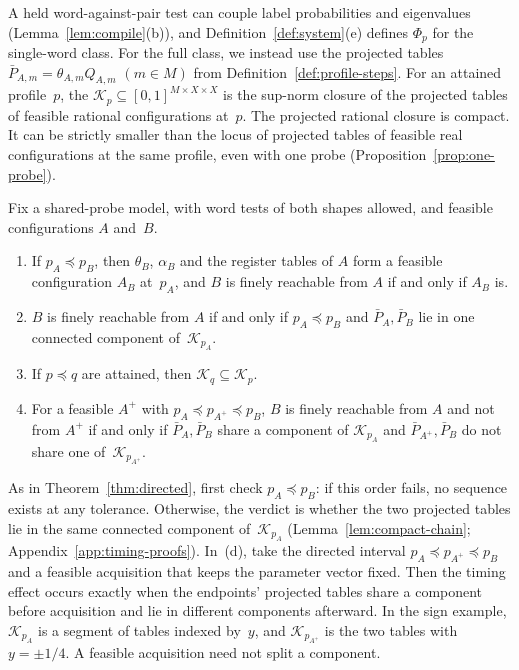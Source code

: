A held word-against-pair test can couple label probabilities and
eigenvalues (Lemma~\ref{lem:compile}(b)), and Definition~\ref{def:system}(e)
defines $\Phi_p$ for the single-word class. For the full class, we instead
use the projected tables $\bar P_{A,m}=\theta_{A,m}Q_{A,m}$ $(m\in M)$
from Definition~\ref{def:profile-steps}. For an attained profile~$p$, the
 $\mathcal K_p\subseteq[0,1]^{M\times X\times X}$ is the sup-norm
closure of the projected tables of feasible rational configurations at~$p$.
The projected rational closure is compact. It can be strictly smaller than
the locus of projected tables of feasible real configurations at the same
profile, even with one probe (Proposition~\ref{prop:one-probe}).

\begin{theorem}\label{thm:projected-components}
Fix a shared-probe model, with word tests of both shapes allowed, and
feasible configurations $A$ and~$B$.
\begin{enumerate}
\item[(a)] If $p_A\preceq p_B$, then $\theta_B$, $\alpha_B$ and the
register tables of $A$ form a feasible configuration $A_B$ at~$p_A$, and
$B$ is finely reachable from $A$ if and only if $A_B$ is.
\item[(b)] $B$ is finely reachable from $A$ if and only if
$p_A\preceq p_B$ and $\bar P_A,\bar P_B$ lie in one connected component
of~$\mathcal K_{p_A}$.
\item[(c)] If $p\preceq q$ are attained, then
$\mathcal K_q\subseteq\mathcal K_p$.
\item[(d)] For a feasible $A^+$ with
$p_A\preceq p_{A^+}\preceq p_B$, $B$ is finely reachable from $A$ and
not from $A^+$ if and only if $\bar P_A,\bar P_B$ share a component of
$\mathcal K_{p_A}$ and $\bar P_{A^+},\bar P_B$ do not share one
of~$\mathcal K_{p_{A^+}}$.
\end{enumerate}
\end{theorem}

As in Theorem~\ref{thm:directed}, first check $p_A\preceq p_B$: if this
order fails, no sequence exists at any tolerance. Otherwise, the verdict
is whether the two projected tables lie in the same connected component
of~$\mathcal K_{p_A}$ (Lemma~\ref{lem:compact-chain};
Appendix~\ref{app:timing-proofs}).
In~(d), take the directed interval $p_A\preceq p_{A^+}\preceq p_B$ and a
feasible acquisition that keeps the parameter vector fixed. Then the
timing effect occurs exactly when the endpoints' projected tables share a
component before acquisition and lie in different components afterward.
In the sign example, $\mathcal K_{p_A}$ is a segment of tables indexed
by~$y$, and $\mathcal K_{p_{A^+}}$ is the two tables with $y=\pm1/4$. A
feasible acquisition need not split a component.

